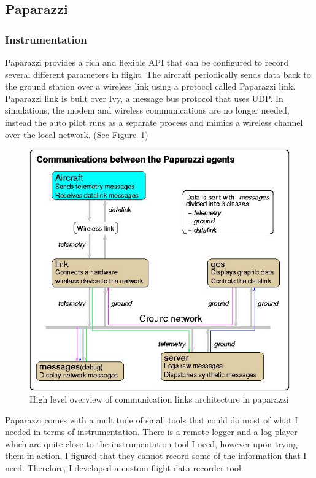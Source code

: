 \subsection{Paparazzi}

\subsubsection{Instrumentation}
Paparazzi provides a rich and flexible API that can be configured to record several different parameters in flight. The aircraft periodically sends data back to the ground station over a wireless link using a protocol called Paparazzi link. Paparazzi link is built over Ivy, a message bus protocol that uses UDP. In simulations, the modem and wireless communications are no longer needed, instead the auto pilot runs as a separate process and mimics a wireless channel over the local network. (See Figure~\ref{fig:paparazzi_comm_agents})

\begin{figure}
    \centering
    \includegraphics[width=\columnwidth]{4_files/Pprz_communication_agents.jpg}
    \caption{High level overview of communication links architecture in paparazzi \cite{hattenberger2014using}}
    \label{fig:paparazzi_comm_agents}
\end{figure}

Paparazzi comes with a multitude of small tools that could do most of what I needed in terms of instrumentation. There is a remote logger and a log player which are quite close to the instrumentation tool I need, however upon trying them in action, I figured that they cannot record some of the information that I need. Therefore, I developed a custom flight data recorder tool. 

